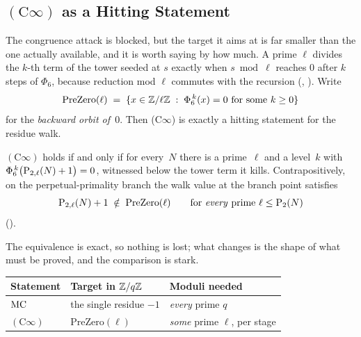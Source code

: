 \subsection{$(\mathrm{C}\infty)$ as a Hitting Statement}
\label{sec:backward-orbit}

The congruence attack is blocked, but the target it aims at is far smaller
than the one actually available, and it is worth saying by how much.  A
prime $\ell$ divides the $k$-th term of the tower seeded
at $s$ exactly when $s \bmod \ell$ reaches $0$ after $k$ steps of
$\Phi_6$, because reduction mod $\ell$ commutes with the recursion
(,
 ).  Write
\[
  \mathrm{PreZero}(\ell)
  \;=\;
  \{x \in \mathbb{Z}/\ell\mathbb{Z} \;:\; \Phi_6^{\,k}(x) = 0 \text{ for some } k \geq 0\}
\]
for the \emph{backward orbit of~$0$}.  Then (C$\infty$) is exactly a
hitting statement for the residue walk.

\begin{theorem}
\label{thm:backward-orbit}
$(\mathrm{C}\infty)$ holds if and only if for every~$N$ there is a
prime~$\ell$ and a level~$k$ with
$\Phi_6^{\,k}\bigl(\mathrm{P}_{2,\ell}(N)+1\bigr) = 0$, witnessed below the tower
term it kills.  Contrapositively, on the perpetual-primality branch the
walk value at the branch point satisfies
\[
  \mathrm{P}_{2,\ell}(N) + 1 \;\notin\; \mathrm{PreZero}(\ell)
  \qquad\text{for \emph{every} prime } \ell \leq \mathrm{P}_{2}(N)
\]
().
\end{theorem}

\noindent
The equivalence is exact, so nothing is lost; what changes is the shape
of what must be proved, and the comparison is stark.

\smallskip
\begin{center}
\begin{tabular}{@{}l@{\quad}l@{\quad}l@{}}
\toprule
\textbf{Statement} & \textbf{Target in $\mathbb{Z}/q\mathbb{Z}$} & \textbf{Moduli needed} \\
\midrule
$\mathrm{MC}$ & the single residue $-1$ & \emph{every} prime $q$ \\
$(\mathrm{C}\infty)$ & $\mathrm{PreZero}(\ell)$ & \emph{some} prime $\ell$, per stage \\
\bottomrule
\end{tabular}
\end{center}

